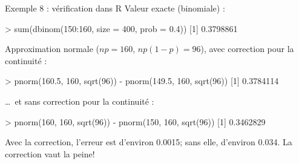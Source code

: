\documentclass{BeamerTemplate}
\begin{document}
\begin{frame}[fragile,t]{Exemple 8 : vérification dans R}
  Valeur exacte (binomiale) :
\begin{console}
> sum(dbinom(150:160, size = 400, prob = 0.4))
[1] 0.3798861
\end{console}

  Approximation normale ($np = 160$, $np(1-p) = 96$), avec correction pour
  la continuité :
\begin{console}
> pnorm(160.5, 160, sqrt(96)) - pnorm(149.5, 160, sqrt(96))
[1] 0.3784114
\end{console}

  \ldots\ et sans correction pour la continuité :
\begin{console}
> pnorm(160, 160, sqrt(96)) - pnorm(150, 160, sqrt(96))
[1] 0.3462829
\end{console}
  {\small\color{gray} Avec la correction, l'erreur est d'environ 0.0015;
  sans elle, d'environ 0.034. La correction vaut la peine!}
\end{frame}
\end{document}
